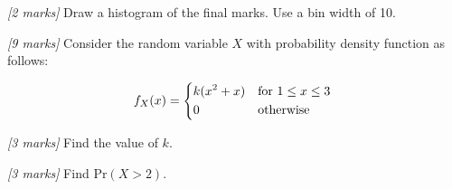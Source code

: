\documentclass{article}\usepackage[]{graphicx}\usepackage[]{xcolor}
\newif \ifmemo
\begin{document}
\ifmemo
\textcolor{red}{\begin{align*}
  s^2 &= \dfrac{1}{n-1}\displaystyle\sum_{i=1}^{n} (x_i-\bar{x})^2 \text{ \tick} \\
  &= \dfrac{1}{11}\left[\left(47-\frac{623}{12}\right)^2 + \left(40-\frac{623}{12}\right)^2 + \cdots + \left(94-\frac{623}{12}\right)^2\right] \text{ \tick} \\
  &= 16.8817  \\
  s &= \sqrt{16.8817} = 4.1087 \text{ \tick}
\end{align*}}
\fi

  \item \textit{[2 marks]} Draw a histogram of the final marks. Use a bin width of 10.



\ifmemo
\textcolor{red}{\tick for correctly labelled axes; \tick for correct drawn histogram}
\fi

\eeq


\item \textit{[9 marks]} Consider the random variable $X$ with probability density function as follows:

  \[ f_X(x) = \begin{dcases*} k( x ^ 2 +  x )  & for $1 \le x \le 3$ \\ 0 & otherwise  \end{dcases*} \]

 
\beq
  \item \textit{[3 marks]} Find the value of $k$.

\ifmemo
  \textcolor{red}{\begin{align*} k\displaystyle\int_{-\infty}^{\infty} f_X(x) dx &= 1 \text{ \tick}\\k \displaystyle\int_{1}^{3} x + x^{2} dx &= 1 \\ k \left[\frac{1}{2} x^{2} + \frac{1}{3} x^{3}\right]_{1}^{3} &= 1 \text{ \tick}\\ k \left[\frac{9}{2} + 9 - \left(\frac{1}{2}+\frac{1}{3}\right)\right] &= 1  \\ k &= \dfrac{3}{38} = 0.07895\text{ \tick}\end{align*}}
\fi

  \item \textit{[3 marks]} Find \(\mathrm{Pr}(X > 2)\).
 
\ifmemo
  \textcolor{red}{\begin{align*} \mathrm{Pr}(X > 2)&= \displaystyle \int_{2}^{3} f_X(x) dx \text{ \tick} \\ &= k \left[\frac{1}{2} x^{2} + \frac{1}{3} x^{3}\right]_{2}^{3} \text{ \tick} \\ &= k\left[\frac{9}{2} + 9-\left(2 + \frac{8}{3}\right)\right] \\ &= \frac{53}{6} k = \dfrac{53}{76} = 0.6974\text{ \tick} \end{align*}}
\fi
\end{document}
